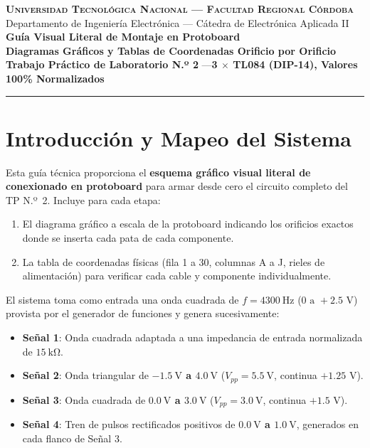 \documentclass[10pt, a4paper]{article}
\begin{document}
\begin{center}
    {\large \textsc{\textbf{Universidad Tecnológica Nacional --- Facultad Regional Córdoba}}}\\[2pt]
    {\normalsize Departamento de Ingeniería Electrónica --- Cátedra de Electrónica Aplicada II}\\[4pt]
    {\LARGE \bfseries \color{utnblue} Guía Visual Literal de Montaje en Protoboard}\\[2pt]
    {\Large \bfseries Diagramas Gráficos y Tablas de Coordenadas Orificio por Orificio}\\[3pt]
    {\small \textbf{Trabajo Práctico de Laboratorio N.º 2} \quad---\quad \textbf{3 $\times$ TL084 (DIP-14), Valores 100\% Normalizados}}
\end{center}
\vspace{-6pt}
\noindent\rule{\textwidth}{1pt}
\vspace{2pt}

\section{Introducción y Mapeo del Sistema}

Esta guía técnica proporciona el \textbf{esquema gráfico visual literal de conexionado en protoboard} para armar desde cero el circuito completo del TP N.º~2. Incluye para cada etapa:
\begin{enumerate}[itemsep=1pt, topsep=1pt]
    \item El diagrama gráfico a escala de la protoboard indicando los orificios exactos donde se inserta cada pata de cada componente.
    \item La tabla de coordenadas físicas (fila 1 a 30, columnas A a J, rieles de alimentación) para verificar cada cable y componente individualmente.
\end{enumerate}

El sistema toma como entrada una onda cuadrada de $f = \SI{4300}{\hertz}$ ($0\text{ a }+2.5\text{ V}$) provista por el generador de funciones y genera sucesivamente:
\begin{itemize}[itemsep=1pt, topsep=1pt]
    \item \textbf{Señal 1}: Onda cuadrada adaptada a una impedancia de entrada normalizada de \textbf{$\SI{15}{\kilo\ohm}$}.
    \item \textbf{Señal 2}: Onda triangular de \textbf{$\SI{-1.5}{\volt}$ a $\SI{+4.0}{\volt}$} ($V_{pp} = \SI{5.5}{\volt}$, continua $+1.25\text{ V}$).
    \item \textbf{Señal 3}: Onda cuadrada de \textbf{$\SI{0.0}{\volt}$ a $\SI{+3.0}{\volt}$} ($V_{pp} = \SI{3.0}{\volt}$, continua $+1.5\text{ V}$).
    \item \textbf{Señal 4}: Tren de pulsos rectificados positivos de \textbf{$\SI{0.0}{\volt}$ a $\SI{+1.0}{\volt}$}, generados en cada flanco de Señal 3.
\end{itemize}
\end{document}
